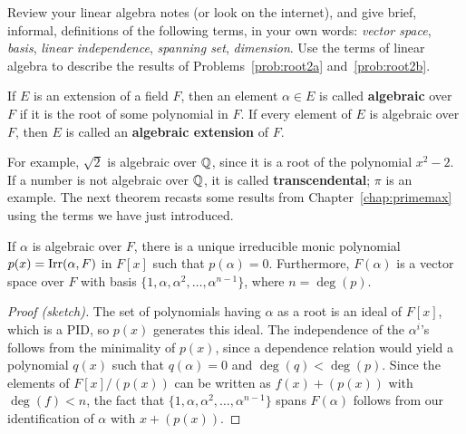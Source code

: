 \begin{problem}
    Review your linear algebra notes (or look on the internet), and give brief, informal, definitions of the following terms, in your own words: \textit{vector space}, \textit{basis}, \textit{linear independence}, \textit{spanning set}, \textit{dimension}. Use the terms of linear algebra to describe the results of Problems~\ref{prob:root2a} and~\ref{prob:root2b}.
\end{problem}

\begin{definition}\label{def:algebraic}
If $E$ is an extension of a field $F$, then an element $\alpha \in E$ is called \textbf{algebraic} over $F$ if it is the root of some polynomial in $F$. If every element of $E$ is algebraic over $F$, then $E$ is called an \textbf{algebraic extension} of $F$.
\end{definition}

For example, $\sqrt{2}$ is algebraic over $\mathbb{Q}$, since it is a root of the polynomial $x^2-2$. If a number is not algebraic over $\mathbb{Q}$, it is called \textbf{transcendental}; $\pi$ is an example. The next theorem recasts some results from Chapter~\ref{chap:primemax} using the terms we have just introduced.

\begin{theorem}\label{thm:aet}
    If $\alpha$ is algebraic over $F$, there is a unique irreducible monic polynomial $p(x) = \operatorname{Irr}(\alpha, F)$ in $F[x]$ such that $p(\alpha)=0$.  Furthermore, $F(\alpha)$ is a vector space over $F$ with basis $\{1, \alpha, \alpha^2, \ldots, \alpha^{n-1}\}$, where $n = \deg(p)$.
\begin{annotation}
\end{annotation}
\end{theorem}

\begin{proof}[Proof (sketch)]
The set of polynomials having $\alpha$ as a root is an ideal of $F[x]$, which is a PID, so $p(x)$ generates this ideal. The independence of the $\alpha^i$'s follows from the minimality of $p(x)$, since a dependence relation would yield a polynomial $q(x)$ such that $q(\alpha)=0$ and $\deg(q) < \deg(p)$. Since the elements of $F[x]/(p(x))$ can be written as $f(x) + (p(x))$ with $\deg(f)<n$, the fact that $\{1, \alpha, \alpha^2, \ldots, \alpha^{n-1}\}$ spans $F(\alpha)$ follows from our identification of $\alpha$ with $x + (p(x))$.
\end{proof}

